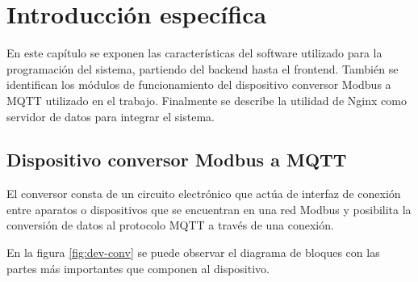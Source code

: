 \chapter{Introducción específica} %

\label{Chapter2}

En este capítulo se exponen las características del software utilizado para la programación del sistema, partiendo del backend hasta el frontend. También se identifican los módulos de funcionamiento del dispositivo conversor Modbus a MQTT utilizado en el trabajo.  Finalmente se describe la utilidad de Nginx como servidor de datos para integrar el sistema. 



\section{Dispositivo conversor Modbus a MQTT}

El conversor consta de un circuito electrónico que actúa de interfaz de conexión entre aparatos o dispositivos que se encuentran en una red Modbus y posibilita la conversión de datos al protocolo MQTT a través de una conexión.

En la figura \ref{fig:dev-conv} se puede observar el diagrama de bloques con las partes más importantes que componen al dispositivo. 


